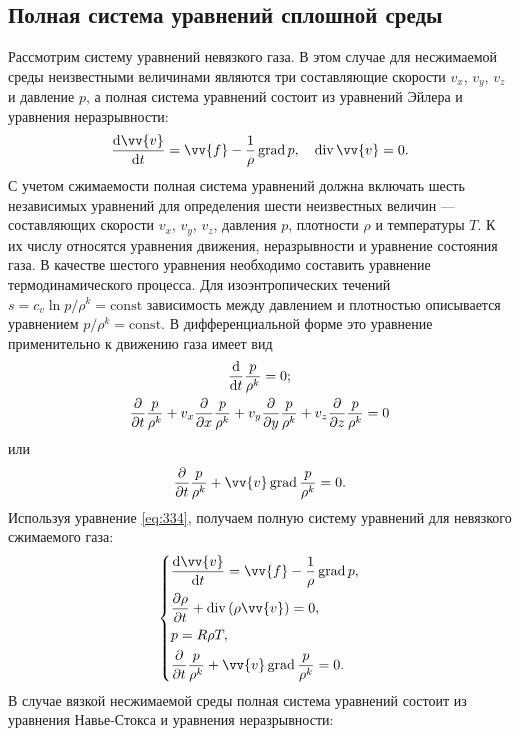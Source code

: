 	\subsection{Полная система уравнений сплошной среды}
	Рассмотрим систему уравнений невязкого газа. В этом случае для несжимаемой среды неизвестными величинами являются три составляющие скорости $v_x$, $v_y$, $v_z$ и давление $p$, а полная система уравнений состоит из уравнений Эйлера и уравнения неразрывности:
	\begin{gather}
		\frac{\dd\vv{v}}{\dd t} = \vv{f} - \frac{1}{\rho}\grad p, \quad \diverg\vv{v} = 0.\label{eq:333}
	\end{gather}\n
	С учетом сжимаемости полная система уравнений должна включать шесть независимых уравнений для определения шести неизвестных величин --- составляющих скорости $v_x$, $v_y$, $v_z$, давления $p$, плотности $\rho$ и температуры $T$. К их числу относятся уравнения движения, неразрывности и уравнение состояния газа. В качестве шестого уравнения необходимо составить уравнение термодинамического процесса. Для изоэнтропических течений $s = c_v\ln p/\rho^k = \mathrm{const}$ зависимость между давлением и плотностью описывается уравнением $p/\rho^k = \mathrm{const}$. В дифференциальной форме это уравнение применительно к движению газа имеет вид
	\begin{gather*}
		\frac{\mathrm{d}}{\mathrm{d} t}\frac{p}{\rho^k} = 0;\\
		\frac{\partial}{\partial t}\frac{p}{\rho^k} + v_x\frac{\partial}{\partial x}\frac{p}{\rho^k} + v_y\frac{\partial}{\partial y}\frac{p}{\rho^k} + v_z\frac{\partial}{\partial z}\frac{p}{\rho^k} = 0
	\end{gather*}
	или
	\begin{gather}
		\frac{\pp}{\pp t}\frac{p}{\rho^k} + \vv{v}\grad\frac{p}{\rho^k} = 0.\label{eq:334}
	\end{gather}\n
	Используя уравнение \eqref{eq:334}, получаем полную систему уравнений для невязкого сжимаемого газа:
	\begin{gather}
		\begin{dcases}\label{eq:335}
			\frac{\dd\vv{v}}{\dd t} = \vv{f} - \frac{1}{\rho}\grad p,\\
			\frac{\pp\rho}{\pp t} + \diverg\left(\rho\vv{v}\right) = 0,\\
			p = R\rho T,\\
			\frac{\pp}{\pp t}\frac{p}{\rho^k} + \vv{v}\grad\frac{p}{\rho^k} = 0.
		\end{dcases}
	\end{gather}\n
	В случае вязкой несжимаемой среды полная система уравнений состоит из уравнения Навье-Стокса и уравнения неразрывности:
